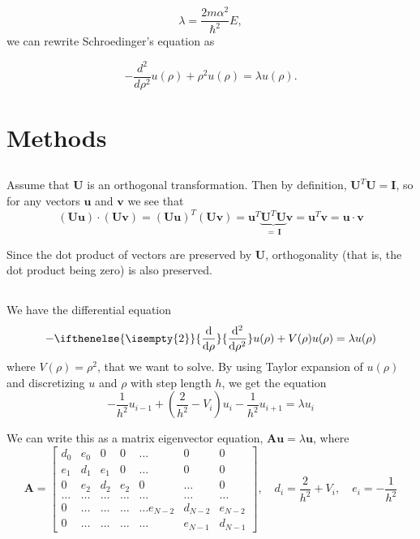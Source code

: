 \documentclass[11pt,a4paper]{article}
\newcommand\V[1]{\mathbf{#1}}                  %
\newcommand\M[1]{\begin{bmatrix} #1 \end{bmatrix}} %
\newcommand\df[3][]{{%
  \ifthenelse{\isempty{#1}}%
    {\frac{\mathrm{d}{#2}}{\mathrm{d}{#3}}}%
    {\frac{\mathrm{d}^{#1}{#2}}{{\mathrm{d}{#3}^{#1}}}}%
}}
\begin{document}
\begin{equation}
\lambda = \frac{2m\alpha^2}{\hbar^2}E,
\end{equation}
we can rewrite Schroedinger's equation as

\begin{equation}
  -\frac{d^2}{d\rho^2} u(\rho) + \rho^2u(\rho)  = \lambda u(\rho).
\end{equation}

\section{Methods}

\subsection{}

Assume that $\V{U}$ is an orthogonal transformation. Then by definition, $\V{U}^T \V{U} = \V{I}$,
so for any vectors $\V{u}$ and $\V{v}$ we see that
\begin{equation}
  \left( \V{U} \V{u} \right) \cdot \left( \V{U} \V{v} \right)
    = \left( \V{U} \V{u} \right)^T \left( \V{U} \V{v} \right)
    = \V{u}^T \underbrace{\V{U}^T \V{U}}_{= \, \V{I}} \V{v}
    = \V{u}^T \V{v} = \V{u} \cdot \V{v}
\end{equation}

Since the dot product of vectors are preserved by $\V{U}$, orthogonality (that is, the dot product
being zero) is also preserved.

\subsection{}

We have the differential equation
\begin{equation}
  - \df[2]{}{\rho} u(\rho) + V(\rho) u(\rho) = \lambda u(\rho)
\end{equation}
where $V(\rho) = \rho^2$, that we want to solve. By using Taylor expansion of $u(\rho)$ and discretizing $u$ and $\rho$ with step length $h$, we
get the equation
\begin{equation}
  - \frac{1}{h^2} u_{i-1} + \left( \frac{2}{h^2} - V_i \right) u_i - \frac{1}{h^2} u_{i+1} = \lambda u_i
\end{equation}

We can write this as a matrix eigenvector equation, $\V{A} \V{u} = \lambda \V{u}$, where
\begin{equation}
  \V{A} = \M{
    d_0 & e_0 & 0   & 0    & \dots  &0     & 0 \\
    e_1 & d_1 & e_1 & 0    & \dots  &0     &0 \\
    0   & e_2 & d_2 & e_2  &0       &\dots & 0\\
    \dots  & \dots & \dots & \dots  &\dots      &\dots & \dots\\
    0   & \dots & \dots & \dots  &\dots  e_{N-2}     &d_{N-2} & e_{N-2}\\
    0   & \dots & \dots & \dots  &\dots       &e_{N-1} & d_{N-1}
  } , \quad
  d_i = \frac{2}{h^2} + V_i , \quad
  e_i = - \frac{1}{h^2}
\end{equation}
\end{document}
